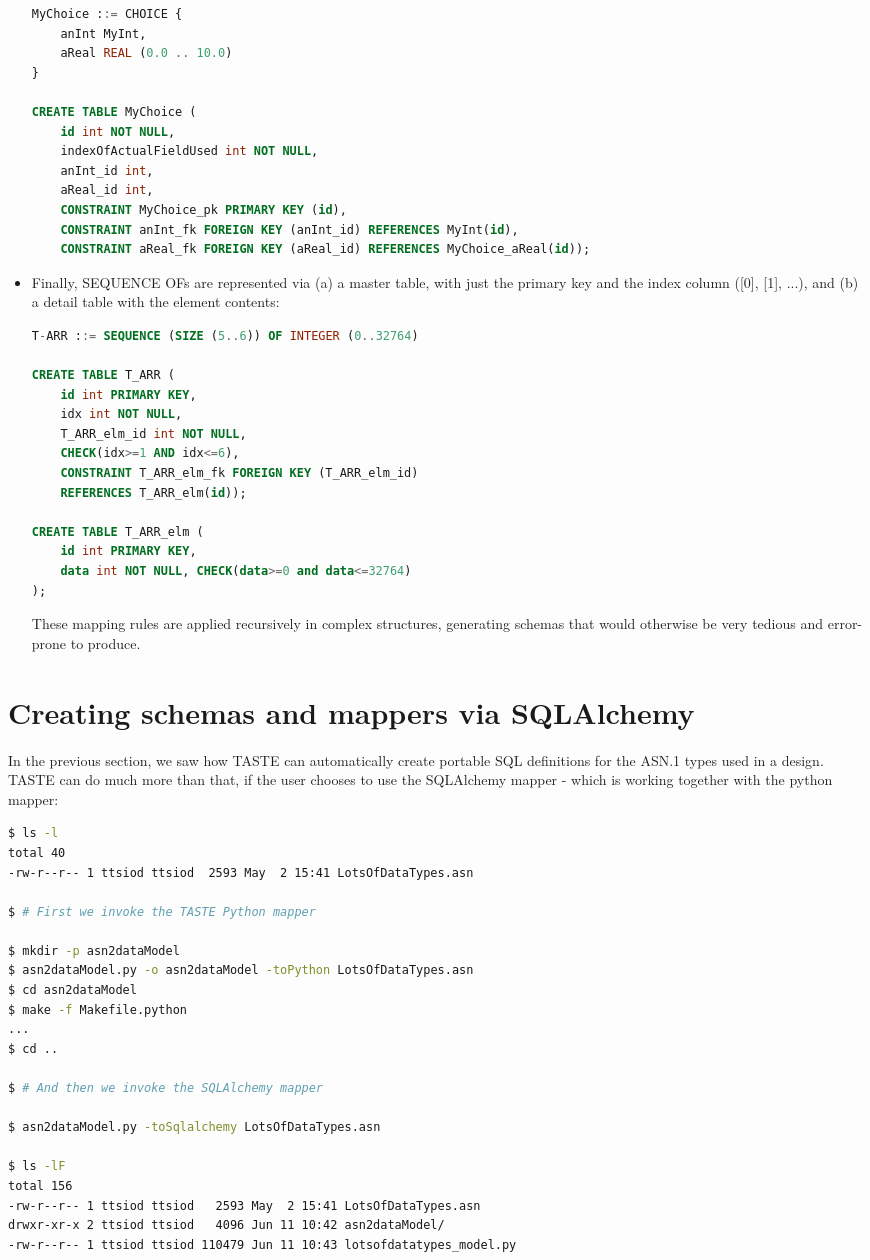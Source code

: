 \documentclass[11pt]{book}
\begin{document}
\begin{itemize}
\begin{lstlisting}[language=SQL]
MyChoice ::= CHOICE {
    anInt MyInt,
    aReal REAL (0.0 .. 10.0)
}

CREATE TABLE MyChoice (
    id int NOT NULL,
    indexOfActualFieldUsed int NOT NULL,
    anInt_id int,
    aReal_id int,
    CONSTRAINT MyChoice_pk PRIMARY KEY (id),
    CONSTRAINT anInt_fk FOREIGN KEY (anInt_id) REFERENCES MyInt(id),
    CONSTRAINT aReal_fk FOREIGN KEY (aReal_id) REFERENCES MyChoice_aReal(id));
\end{lstlisting}

    \item Finally, SEQUENCE OFs are represented via (a) a master table, with just the primary key and the index column ([0], [1], ...), and (b) a detail table with the element contents:

\begin{lstlisting}[language=SQL]
T-ARR ::= SEQUENCE (SIZE (5..6)) OF INTEGER (0..32764)

CREATE TABLE T_ARR (
    id int PRIMARY KEY,
    idx int NOT NULL,
    T_ARR_elm_id int NOT NULL,
    CHECK(idx>=1 AND idx<=6),
    CONSTRAINT T_ARR_elm_fk FOREIGN KEY (T_ARR_elm_id)
    REFERENCES T_ARR_elm(id));

CREATE TABLE T_ARR_elm (
    id int PRIMARY KEY,
    data int NOT NULL, CHECK(data>=0 and data<=32764)
);
\end{lstlisting}

These mapping rules are applied recursively in complex structures, generating schemas that would otherwise be very tedious and error-prone to produce.
\end{itemize}

\section{Creating schemas and mappers via SQLAlchemy}

In the previous section, we saw how TASTE can automatically create portable SQL definitions for the ASN.1 types used in a design. TASTE can do much more than that, if the user chooses to use the SQLAlchemy mapper - which is working together with the python mapper:

\begin{lstlisting}[language=bash]
$ ls -l
total 40
-rw-r--r-- 1 ttsiod ttsiod  2593 May  2 15:41 LotsOfDataTypes.asn

$ # First we invoke the TASTE Python mapper

$ mkdir -p asn2dataModel
$ asn2dataModel.py -o asn2dataModel -toPython LotsOfDataTypes.asn
$ cd asn2dataModel
$ make -f Makefile.python
...
$ cd ..

$ # And then we invoke the SQLAlchemy mapper

$ asn2dataModel.py -toSqlalchemy LotsOfDataTypes.asn

$ ls -lF
total 156
-rw-r--r-- 1 ttsiod ttsiod   2593 May  2 15:41 LotsOfDataTypes.asn
drwxr-xr-x 2 ttsiod ttsiod   4096 Jun 11 10:42 asn2dataModel/
-rw-r--r-- 1 ttsiod ttsiod 110479 Jun 11 10:43 lotsofdatatypes_model.py
\end{lstlisting}
\end{document}
